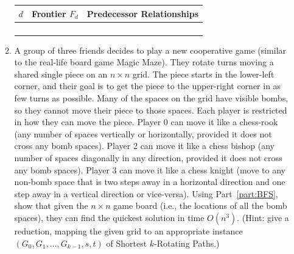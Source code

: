 \documentclass[11pt]{article}
\begin{document}
\begin{enumerate}
\begin{enumerate}
        \begin{table}[ht]
        \centering
        \begin{tabular}{c|c|c}
            $d$ & Frontier $F_d$& Predecessor Relationships \\
            \hline
              & & \\
              & & \\
              & & \\
              & & \\
        \end{tabular}
    \end{table}
    \item 
        A group of three friends decides to play a new cooperative game (similar to the real-life board game Magic Maze).  They rotate turns moving a shared single piece on an $n\times n$ grid.  The piece starts in the lower-left corner, and their goal is to get the piece to the upper-right corner in as few turns as possible.  Many of the spaces on the grid have visible bombs, so they cannot move their piece to those spaces.  Each player is restricted in how they can move the piece.  Player 0 can move it like a chess-rook (any number of spaces vertically or horizontally, provided it does not cross any bomb spaces). Player 2 can move it like a chess bishop (any number of spaces diagonally in any direction, provided it does not cross any bomb spaces).  Player 3 can move it like a chess knight (move to any non-bomb space that is two steps away in a horizontal direction and one step away in a vertical direction or vice-versa).   Using Part~\ref{part:BFS}, show that given the $n\times n$ game board (i.e., the locations of all the bomb spaces), they can find the quickest solution in time $O(n^3)$.  
        (Hint: give a reduction, mapping the given grid to an appropriate instance $(G_0,G_1,\ldots,G_{k-1},s,t)$ of Shortest $k$-Rotating Paths.)
    \end{enumerate}
\end{enumerate}
\end{document}

